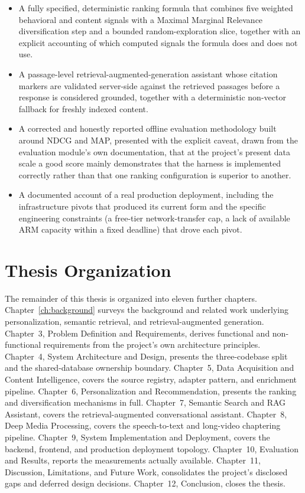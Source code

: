 \begin{itemize}
  \item A fully specified, deterministic ranking formula that combines five weighted behavioral and content signals with a Maximal Marginal Relevance diversification step and a bounded random-exploration slice, together with an explicit accounting of which computed signals the formula does and does not use.
  \item A passage-level retrieval-augmented-generation assistant whose citation markers are validated server-side against the retrieved passages before a response is considered grounded, together with a deterministic non-vector fallback for freshly indexed content.
  \item A corrected and honestly reported offline evaluation methodology built around NDCG and MAP, presented with the explicit caveat, drawn from the evaluation module's own documentation, that at the project's present data scale a good score mainly demonstrates that the harness is implemented correctly rather than that one ranking configuration is superior to another.
  \item A documented account of a real production deployment, including the infrastructure pivots that produced its current form and the specific engineering constraints (a free-tier network-transfer cap, a lack of available ARM capacity within a fixed deadline) that drove each pivot.
\end{itemize}

\section{Thesis Organization}

The remainder of this thesis is organized into eleven further chapters. Chapter~\ref{ch:background} surveys the background and related work underlying personalization, semantic retrieval, and retrieval-augmented generation. Chapter~3, Problem Definition and Requirements, derives functional and non-functional requirements from the project's own architecture principles. Chapter~4, System Architecture and Design, presents the three-codebase split and the shared-database ownership boundary. Chapter~5, Data Acquisition and Content Intelligence, covers the source registry, adapter pattern, and enrichment pipeline. Chapter~6, Personalization and Recommendation, presents the ranking and diversification mechanisms in full. Chapter~7, Semantic Search and RAG Assistant, covers the retrieval-augmented conversational assistant. Chapter~8, Deep Media Processing, covers the speech-to-text and long-video chaptering pipeline. Chapter~9, System Implementation and Deployment, covers the backend, frontend, and production deployment topology. Chapter~10, Evaluation and Results, reports the measurements actually available. Chapter~11, Discussion, Limitations, and Future Work, consolidates the project's disclosed gaps and deferred design decisions. Chapter~12, Conclusion, closes the thesis.
